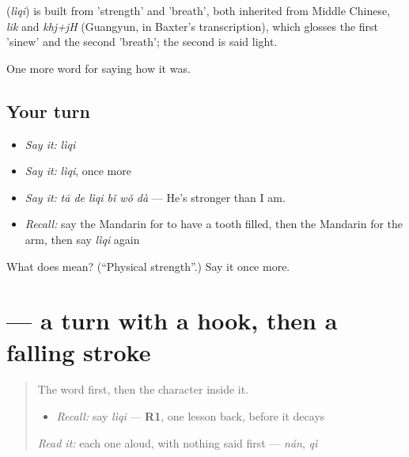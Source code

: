 \begin{cousinweb}
\textbf{} (\emph{lìqi}) is built from  'strength' and  'breath', both inherited from Middle Chinese, \emph{lik} and \emph{khj+jH} (Guangyun, in Baxter's transcription), which glosses the first 'sinew' and the second 'breath'; the second is said light.
\end{cousinweb}

\begin{grammarlens}[title={What you've built}]
One more word for saying how it was.
\end{grammarlens}

\subsection*{Your turn}
\begin{itemize}
\raggedright
  \item \emph{Say it:} \emph{lìqi}
  \item \emph{Say it:} \emph{lìqi}, once more
  \item \emph{Say it:} \emph{tā de lìqi bǐ wǒ dà} — He's stronger than I am.
  \item \emph{Recall:} say the Mandarin for to have a tooth filled, then the Mandarin for the arm, then say \emph{lìqi} again
\end{itemize}

\begin{tcolorbox}[breakable,colback=teal!4,colframe=teal!35!black,title={Before you move on}]
What does  mean? (\textquotedblleft{}Physical strength\textquotedblright{}.) Say it once more.
\end{tcolorbox}
\section[\texorpdfstring{\zh{力} (lì)}{力 (lì)}]{ — a turn with a hook, then a falling stroke}

\label{lesson:ZH-W474-li-strength}



\begin{quote}
The word first, then the character inside it.

\begin{itemize}
\raggedright
  \item \emph{Recall:} say \emph{lìqi} — \textbf{R1}, one lesson back, before it decays
\end{itemize}

\begin{quote}
 
\end{quote}

\emph{Read it:} each one aloud, with nothing said first — \emph{nán}, \emph{qì}
\end{quote}

